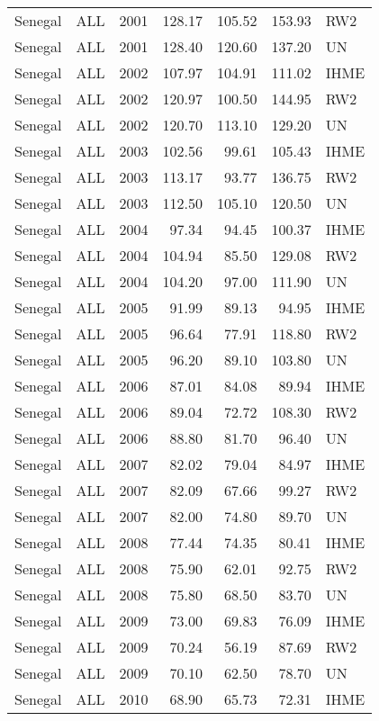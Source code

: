 \begin{longtable}{lllrrrl}
  Senegal & ALL & 2001 & 128.17 & 105.52 & 153.93 & RW2 \\ 
  Senegal & ALL & 2001 & 128.40 & 120.60 & 137.20 & UN \\ 
  Senegal & ALL & 2002 & 107.97 & 104.91 & 111.02 & IHME \\ 
  Senegal & ALL & 2002 & 120.97 & 100.50 & 144.95 & RW2 \\ 
  Senegal & ALL & 2002 & 120.70 & 113.10 & 129.20 & UN \\ 
  Senegal & ALL & 2003 & 102.56 & 99.61 & 105.43 & IHME \\ 
  Senegal & ALL & 2003 & 113.17 & 93.77 & 136.75 & RW2 \\ 
  Senegal & ALL & 2003 & 112.50 & 105.10 & 120.50 & UN \\ 
  Senegal & ALL & 2004 & 97.34 & 94.45 & 100.37 & IHME \\ 
  Senegal & ALL & 2004 & 104.94 & 85.50 & 129.08 & RW2 \\ 
  Senegal & ALL & 2004 & 104.20 & 97.00 & 111.90 & UN \\ 
  Senegal & ALL & 2005 & 91.99 & 89.13 & 94.95 & IHME \\ 
  Senegal & ALL & 2005 & 96.64 & 77.91 & 118.80 & RW2 \\ 
  Senegal & ALL & 2005 & 96.20 & 89.10 & 103.80 & UN \\ 
  Senegal & ALL & 2006 & 87.01 & 84.08 & 89.94 & IHME \\ 
  Senegal & ALL & 2006 & 89.04 & 72.72 & 108.30 & RW2 \\ 
  Senegal & ALL & 2006 & 88.80 & 81.70 & 96.40 & UN \\ 
  Senegal & ALL & 2007 & 82.02 & 79.04 & 84.97 & IHME \\ 
  Senegal & ALL & 2007 & 82.09 & 67.66 & 99.27 & RW2 \\ 
  Senegal & ALL & 2007 & 82.00 & 74.80 & 89.70 & UN \\ 
  Senegal & ALL & 2008 & 77.44 & 74.35 & 80.41 & IHME \\ 
  Senegal & ALL & 2008 & 75.90 & 62.01 & 92.75 & RW2 \\ 
  Senegal & ALL & 2008 & 75.80 & 68.50 & 83.70 & UN \\ 
  Senegal & ALL & 2009 & 73.00 & 69.83 & 76.09 & IHME \\ 
  Senegal & ALL & 2009 & 70.24 & 56.19 & 87.69 & RW2 \\ 
  Senegal & ALL & 2009 & 70.10 & 62.50 & 78.70 & UN \\ 
  Senegal & ALL & 2010 & 68.90 & 65.73 & 72.31 & IHME \\ 

\end{longtable}
